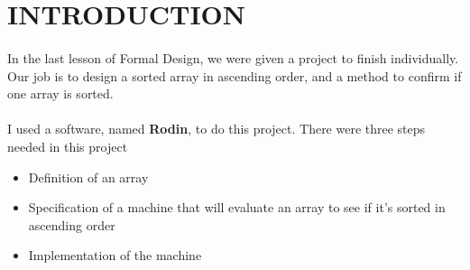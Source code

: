 \section{INTRODUCTION}

\paragraph{}
In the last lesson of Formal Design, we were given a project to finish individually. Our job is to design a sorted array in ascending order, and a method to confirm if one array is sorted.  

\paragraph{}
I used a software, named \textbf{Rodin}, to do this project. There were three steps needed in this project

\begin{itemize}
\item Definition of an array
\item Specification of a machine that will evaluate an array to see if it's sorted in ascending order
\item Implementation of the machine
\end{itemize}